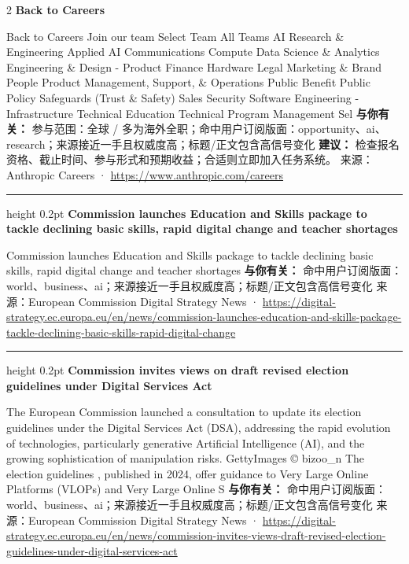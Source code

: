\documentclass[10.5pt]{ctexart}
\begin{document}
\begin{multicols}{2}
{\large\bfseries Back to Careers}\par
Back to Careers Join our team Select Team All Teams AI Research \& Engineering Applied AI Communications Compute Data Science \& Analytics Engineering \& Design - Product Finance Hardware Legal Marketing \& Brand People Product Management, Support, \& Operations Public Benefit Public Policy Safeguards (Trust \& Safety) Sales Security Software Engineering - Infrastructure Technical Education Technical Program Management Sel
\textbf{与你有关：} 参与范围：全球 / 多为海外全职；命中用户订阅版面：opportunity、ai、research；来源接近一手且权威度高；标题/正文包含高信号变化
\textbf{建议：} 检查报名资格、截止时间、参与形式和预期收益；合适则立即加入任务系统。
{\footnotesize\color{ormuted} 来源：Anthropic Careers · \url{https://www.anthropic.com/careers}}
\vspace{2mm}
\hrule height 0.2pt
\vspace{2mm}
{\large\bfseries Commission launches Education and Skills package to tackle declining basic skills, rapid digital change and teacher shortages}\par
Commission launches Education and Skills package to tackle declining basic skills, rapid digital change and teacher shortages
\textbf{与你有关：} 命中用户订阅版面：world、business、ai；来源接近一手且权威度高；标题/正文包含高信号变化
{\footnotesize\color{ormuted} 来源：European Commission Digital Strategy News · \url{https://digital-strategy.ec.europa.eu/en/news/commission-launches-education-and-skills-package-tackle-declining-basic-skills-rapid-digital-change}}
\vspace{2mm}
\hrule height 0.2pt
\vspace{2mm}
{\large\bfseries Commission invites views on draft revised election guidelines under Digital Services Act}\par
The European Commission launched a consultation to update its election guidelines under the Digital Services Act (DSA), addressing the rapid evolution of technologies, particularly generative Artificial Intelligence (AI), and the growing sophistication of manipulation risks. GettyImages © bizoo\_n The election guidelines , published in 2024, offer guidance to Very Large Online Platforms (VLOPs) and Very Large Online S
\textbf{与你有关：} 命中用户订阅版面：world、business、ai；来源接近一手且权威度高；标题/正文包含高信号变化
{\footnotesize\color{ormuted} 来源：European Commission Digital Strategy News · \url{https://digital-strategy.ec.europa.eu/en/news/commission-invites-views-draft-revised-election-guidelines-under-digital-services-act}}

\end{multicols}
\end{document}
